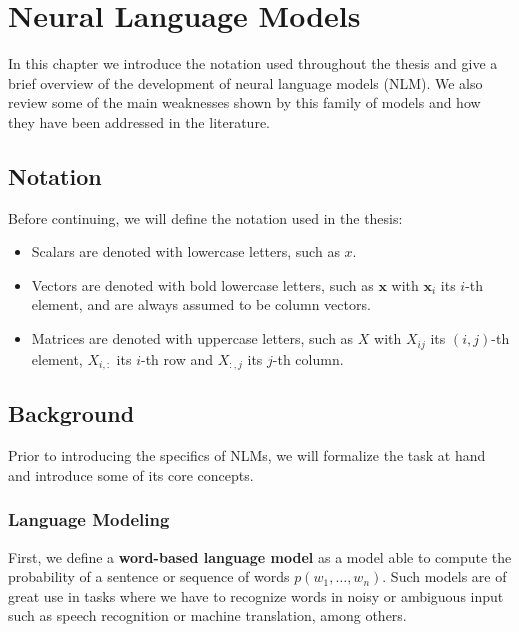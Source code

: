 \chapter{Neural Language Models}
\label{chapter:nlm}

In this chapter we introduce the notation used throughout the thesis and give a brief overview of the development of neural language models (NLM). We also review some of the main weaknesses shown by this family of models and how they have been addressed in the literature. 

\section{Notation}
\label{sec:notation}

Before continuing, we will define the notation used in the thesis:

\begin{itemize}
	\item Scalars are denoted with lowercase letters, such as $x$.
	
	\item Vectors are denoted with bold lowercase letters, such as $\mathbf{x}$ with $\mathbf{x}_i$ its $i$-th element, and are always assumed to be column vectors.
	
	\item Matrices are denoted with uppercase letters, such as $X$ with $X_{ij}$ its $(i,j)$-th element, $X_{i,:}$ its $i$-th row and $X_{:,j}$ its $j$-th column.
\end{itemize}

\section{Background}
\label{sec:background}

Prior to introducing the specifics of NLMs, we will formalize the task at hand and introduce some of its core concepts. 

\subsection{Language Modeling}

First, we define a \textbf{word-based language model} as a model able to compute the probability of a sentence or sequence of words $p(w_1, \ldots ,w_n)$. Such models are of great use in tasks where we have to recognize words in noisy or ambiguous input such as speech recognition or machine translation, among others.

